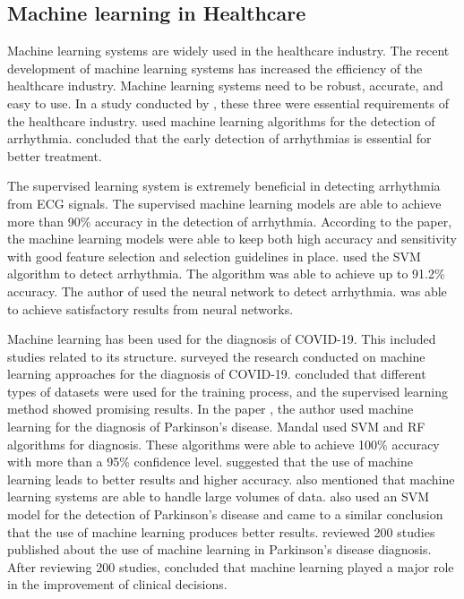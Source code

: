 \subsection{Machine learning in Healthcare}\label{subsec:machine_learning_in_healthcare}

Machine learning systems are widely used in the healthcare industry. The recent development of machine learning systems has increased the efficiency of the healthcare industry. Machine learning systems need to be robust, accurate, and easy to use. In a study conducted by \cite{ref_paper_4}, these three were essential requirements of the healthcare industry. \citeauthor{ref_paper_4} used machine learning algorithms for the detection of arrhythmia. \citeauthor{ref_paper_4} concluded that the early detection of arrhythmias is essential for better treatment.

The supervised learning system is extremely beneficial in detecting arrhythmia from ECG signals. The supervised machine learning models are able to achieve more than 90\% accuracy in the detection of arrhythmia. According to the \cite{ref_paper_28} paper, the machine learning models were able to keep both high accuracy and sensitivity with good feature selection and selection guidelines in place. \cite{ref_paper_38} used the SVM algorithm to detect arrhythmia. The algorithm was able to achieve up to 91.2\% accuracy. The author of \cite{ref_paper_16} used the neural network to detect arrhythmia. \citeauthor{ref_paper_16} was able to achieve satisfactory results from neural networks.

Machine learning has been used for the diagnosis of COVID-19. This included studies related to its structure. \cite{ref_paper_20} surveyed the research conducted on machine learning approaches for the diagnosis of COVID-19. \citeauthor{ref_paper_20} concluded that different types of datasets were used for the training process, and the supervised learning method showed promising results. In the paper \cite{ref_paper_34}, the author used machine learning for the diagnosis of Parkinson's disease. Mandal used SVM and RF algorithms for diagnosis. These algorithms were able to achieve 100\% accuracy with more than a 95\% confidence level. \cite{ref_paper_15} suggested that the use of machine learning leads to better results and higher accuracy. \citeauthor{ref_paper_15} also mentioned that machine learning systems are able to handle large volumes of data. \cite{ref_paper_30} also used an SVM model for the detection of Parkinson's disease and came to a similar conclusion that the use of machine learning produces better results. \cite{ref_paper_27} reviewed 200 studies published about the use of machine learning in Parkinson's disease diagnosis. After reviewing 200 studies, \cite{ref_paper_27} concluded that machine learning played a major role in the improvement of clinical decisions.

